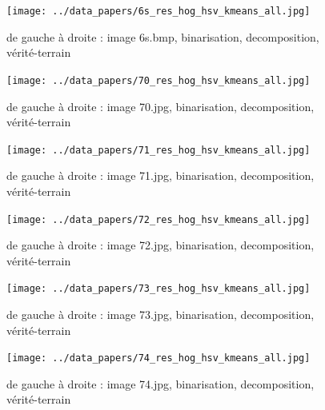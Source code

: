 \documentclass{book}
\begin{document}
\begin{figure}[H]
\begin{center}
\texttt{[image: ../data\_papers/6s\_res\_hog\_hsv\_kmeans\_all.jpg]}
\end{center}
\caption{de gauche à droite : image 6s.bmp, binarisation, decomposition, vérité-terrain}
\label{6s}
\end{figure}
\clearpage


\begin{figure}[H]
\begin{center}
\texttt{[image: ../data\_papers/70\_res\_hog\_hsv\_kmeans\_all.jpg]}
\end{center}
\caption{de gauche à droite : image 70.jpg, binarisation, decomposition, vérité-terrain}
\label{70}
\end{figure}
\clearpage


\begin{figure}[H]
\begin{center}
\texttt{[image: ../data\_papers/71\_res\_hog\_hsv\_kmeans\_all.jpg]}
\end{center}
\caption{de gauche à droite : image 71.jpg, binarisation, decomposition, vérité-terrain}
\label{71}
\end{figure}
\clearpage


\begin{figure}[H]
\begin{center}
\texttt{[image: ../data\_papers/72\_res\_hog\_hsv\_kmeans\_all.jpg]}
\end{center}
\caption{de gauche à droite : image 72.jpg, binarisation, decomposition, vérité-terrain}
\label{72}
\end{figure}
\clearpage


\begin{figure}[H]
\begin{center}
\texttt{[image: ../data\_papers/73\_res\_hog\_hsv\_kmeans\_all.jpg]}
\end{center}
\caption{de gauche à droite : image 73.jpg, binarisation, decomposition, vérité-terrain}
\label{73}
\end{figure}
\clearpage


\begin{figure}[H]
\begin{center}
\texttt{[image: ../data\_papers/74\_res\_hog\_hsv\_kmeans\_all.jpg]}
\end{center}
\caption{de gauche à droite : image 74.jpg, binarisation, decomposition, vérité-terrain}
\label{74}
\end{figure}
\clearpage
\end{document}
